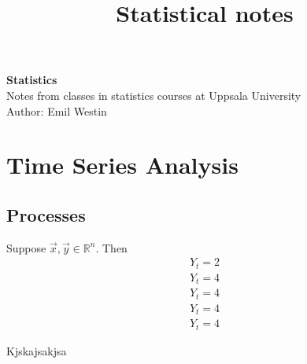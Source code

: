\documentclass[11pt]{article}
\begin{document}
\title{Statistical notes}

\thispagestyle{empty}

\begin{center}
{\LARGE \bf Statistics}\\
Notes from classes in statistics courses at Uppsala University \\
Author: Emil Westin
\end{center}

\section{Time Series Analysis}
\subsection{Processes}

Suppose $\vec{x},\vec{y} \in \mathbb{R}^n$. Then 
\begin{align}
Y_t = 2 \label{MA1} \\
Y_t = 4 \label{MA2} \\
Y_t = 4 \label{AR1} \\
Y_t = 4 \label{AR2} \\
Y_t = 4 \label{ARMA} 
\end{align}

Kjskajsakjsa
\end{document}
